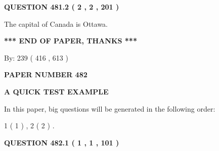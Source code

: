 \documentclass[12pt]{article}
\begin{document}
 
  
\vspace{0.2in}
  
{\textbf{\Large{QUESTION
481.2 
 ( 2 , 2 , 201 )
}}}
  
  
 
 
\noindent{}
 
 
The capital of Canada is Ottawa.
 
 
 
 
   
   
 \vspace{0.2in}
 
   
   
   
   
\vspace{1.0in} 
{\textbf{\large{ *** END OF PAPER, THANKS *** }}} 
   
   
\hspace{1.0in} By: 
 239 ( 416 ,  613 )
   
   
   
   
\newpage 
\setcounter{page}{ 
   482001 } 
   
   
   
   
 {\textbf{ \Large{ PAPER NUMBER  482  }}}
   
   
\vspace{0.2in}
   
   
   
   
   
   
 \vspace{0.2in}
{\LARGE {\textbf{ A QUICK TEST EXAMPLE}}}
   
   
   
\vspace{0.2in}
   
In this paper, big questions will be generated in the following order: 
   
   
   1 ( 1 )
 ,
   2 ( 2 )
 .
  
\vspace{0.2in}
  
{\textbf{\Large{QUESTION
482.1 
 ( 1 , 1 , 101 )
}}}
  
  
 
 
\noindent{}
\end{document}
